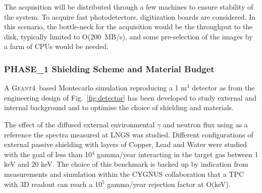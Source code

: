 \documentclass[physics,article,submit,moreauthors,pdftex]{Definitions/mdpi}
\newcommand{\GEANT} {{\textsc{Geant4}}\xspace}
\begin{document}

The acquisition will be distributed through a few 
machines to ensure stability of the system. To acquire fast photodetectors, digitization boards are considered. In this scenario, the bottle-neck for the acquisition would be the throughput to the disk, typically limited to O(200~MB/s),
and some pre-selection of the images by a farm of CPUs would be needed. 


\subsubsection{PHASE\_1 Shielding Scheme and Material Budget}\label{sec:back}

A \GEANT~based Montecarlo simulation reproducing a 1 m$^3$ detector as from the engineering design of Fig.~\ref{fig:detector} has been developed to study external and internal background and to optimise the choice of shielding and materials. 

The effect of the diffused external environmental $\gamma$ and neutron flux using as a reference the spectra measured at LNGS was studied. Different configurations of external passive shielding with layers of Copper, Lead and Water were studied with the goal of less than 10$^4$ gamma/year interacting in the target gas between 1 keV and 20 keV. The choice of this benchmark is backed up by indication from measurements\cite{Riffard:2016mgw,Phan:2015pda} and simulation within the CYGNUS collaboration\cite{Vahsen:2020pzb} that a TPC with 3D readout can reach a 10$^5$ gamma/year rejection factor at O(keV). 
\end{document}
